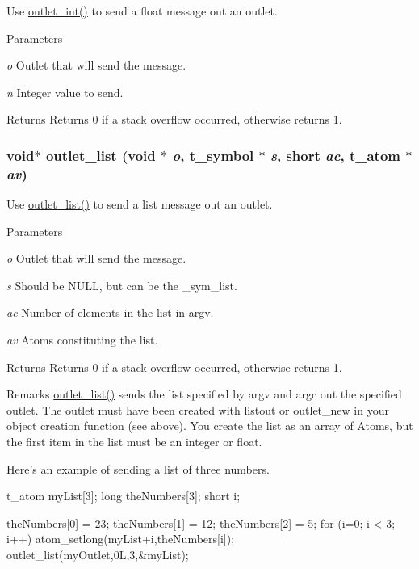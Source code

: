 Use \hyperlink{group__inout_ga0b2b38216f2f4dba486bfcd2273f255e}{outlet\_\-int()} to send a float message out an outlet. 
\begin{DoxyParams}{Parameters}
\item[{\em o}]Outlet that will send the message. \item[{\em n}]Integer value to send. \end{DoxyParams}
\begin{DoxyReturn}{Returns}
Returns 0 if a stack overflow occurred, otherwise returns 1. 
\end{DoxyReturn}
\hypertarget{group__inout_gabdef4fbe6e1040dc28204b8070bdcda5}{
\subsubsection[{outlet\_\-list}]{\setlength{\rightskip}{0pt plus 5cm}void$\ast$ outlet\_\-list (void $\ast$ {\em o}, \/  {\bf t\_\-symbol} $\ast$ {\em s}, \/  short {\em ac}, \/  {\bf t\_\-atom} $\ast$ {\em av})}}
\label{group__inout_gabdef4fbe6e1040dc28204b8070bdcda5}


Use \hyperlink{group__inout_gabdef4fbe6e1040dc28204b8070bdcda5}{outlet\_\-list()} to send a list message out an outlet. 
\begin{DoxyParams}{Parameters}
\item[{\em o}]Outlet that will send the message. \item[{\em s}]Should be NULL, but can be the \_\-sym\_\-list. \item[{\em ac}]Number of elements in the list in argv. \item[{\em av}]Atoms constituting the list. \end{DoxyParams}
\begin{DoxyReturn}{Returns}
Returns 0 if a stack overflow occurred, otherwise returns 1.
\end{DoxyReturn}
\begin{DoxyRemark}{Remarks}
\hyperlink{group__inout_gabdef4fbe6e1040dc28204b8070bdcda5}{outlet\_\-list()} sends the list specified by argv and argc out the specified outlet. The outlet must have been created with listout or outlet\_\-new in your object creation function (see above). You create the list as an array of Atoms, but the first item in the list must be an integer or float.
\end{DoxyRemark}
Here’s an example of sending a list of three numbers. 
\begin{DoxyCode}
    t_atom myList[3]; 
    long theNumbers[3]; 
    short i; 
    
    theNumbers[0] = 23; 
    theNumbers[1] = 12; 
    theNumbers[2] = 5;
    for (i=0; i < 3; i++) { 
        atom_setlong(myList+i,theNumbers[i]);
    } 
    outlet_list(myOutlet,0L,3,&myList); 
\end{DoxyCode}


